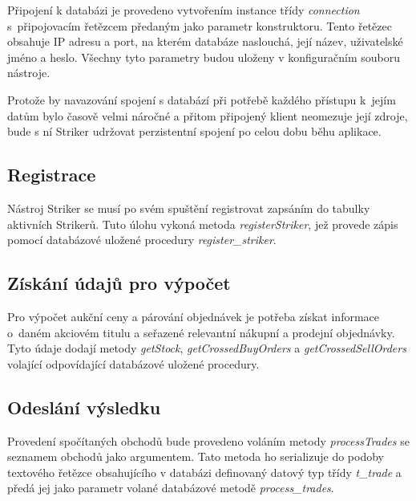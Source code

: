 \documentclass[thesis=M,czech]{FITthesis}[2012/06/26]
\begin{document}
Připojení k databázi je provedeno vytvořením instance třídy \textit{connection} s~připojovacím řetězcem předaným jako parametr
konstruktoru. Tento řetězec obsahuje IP adresu a port, na kterém databáze naslouchá, její název, uživatelské jméno a heslo. 
Všechny tyto parametry budou uloženy v konfiguračním souboru nástroje. 

Protože by navazování spojení s databází při potřebě každého přístupu k~jejím datům bylo časově velmi náročné a přitom připojený 
klient neomezuje její zdroje, bude s ní Striker udržovat perzistentní spojení po celou dobu běhu aplikace. 


\subsection{Registrace}

Nástroj Striker se musí po svém spuštění registrovat zapsáním do tabulky aktivních Strikerů. Tuto úlohu vykoná metoda 
\textit{registerStriker}, jež provede zápis pomocí databázové uložené procedury \textit{register\_striker}. 


\subsection{Získání údajů pro výpočet}

Pro výpočet aukční ceny a párování objednávek je potřeba získat informace o~daném akciovém titulu a seřazené relevantní 
nákupní a prodejní objednávky. Tyto údaje dodají metody \textit{getStock}, \textit{getCrossedBuyOrders} a 
\textit{getCrossedSellOrders} volající odpovídající databázové uložené procedury.


\subsection{Odeslání výsledku}

Provedení spočítaných obchodů bude provedeno voláním metody \textit{processTrades} se seznamem obchodů jako 
argumentem. Tato metoda ho serializuje do podoby textového řetězce obsahujícího v databázi definovaný datový typ 
třídy \textit{t\_trade} a předá jej jako parametr volané databázové metodě \textit{process\_trades}. 

\end{document}
